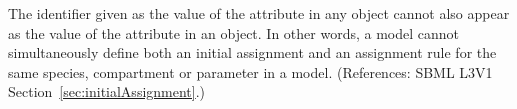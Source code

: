 The identifier given as the value of the attribute  in
any \InitialAssignment object cannot also appear as the value of the
 attribute in an \AssignmentRule object.  In other words, a
model cannot simultaneously define both an initial assignment and an
assignment rule for the same species, compartment or parameter in a model.
(References: SBML L3V1 Section~\ref{sec:initialAssignment}.)
